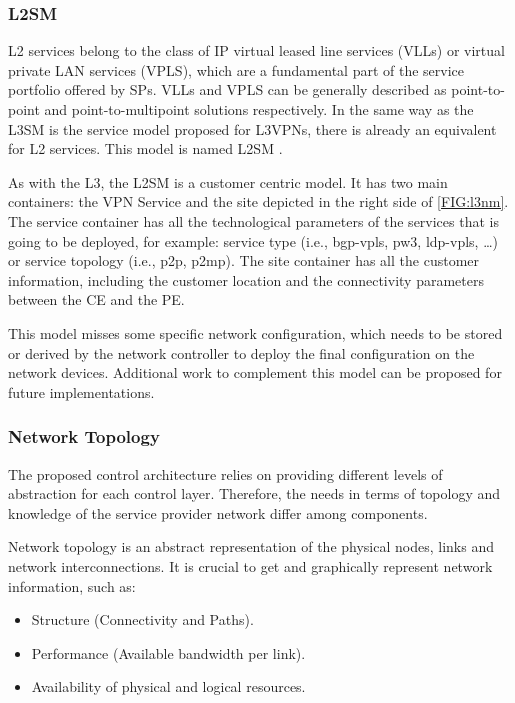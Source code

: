 \documentclass[a4paper,fleqn]{cas-dc}
\begin{document}
\subsubsection{L2SM}
\label{section:l2nm}

L2 services belong to the class of IP virtual leased line services (VLLs) or virtual private LAN services (VPLS)\cite{andersson2006framework}, which are a fundamental part of the service portfolio offered by SPs. VLLs and VPLS can be generally described as point-to-point and point-to-multipoint solutions respectively. In the same way as the L3SM is the service model proposed for L3VPNs, there is already an equivalent for L2 services. This model is named L2SM \cite{wen2018yang}. 

As with the L3, the L2SM is a customer centric model. It has two main containers: the VPN Service and the site depicted in the right side of \cref{FIG:l3nm}. The service container has all the technological parameters of the services that is going to be deployed, for example: service type (i.e., bgp-vpls, pw3, ldp-vpls, \dots) or service topology (i.e., p2p, p2mp). The site container has all the customer information, including the customer location and the connectivity parameters between the CE and the PE. 

This model misses some specific network configuration, which needs to be stored or derived by the network controller to deploy the final configuration on the network devices. Additional work to complement this model can be proposed for future implementations.  

\subsubsection{Network Topology}
\label{subsection:IPtopo}

The proposed control architecture relies on providing different levels of abstraction for each control layer. Therefore, the needs in terms of topology and knowledge of the service provider network differ among components. 

Network topology is an abstract representation of the physical nodes, links and network interconnections. It is crucial to get and graphically represent network information, such as:
\begin{itemize}
    \item Structure (Connectivity and Paths).
    \item Performance (Available bandwidth per link).
    \item Availability of physical and logical resources.
\end{itemize}
\end{document}
